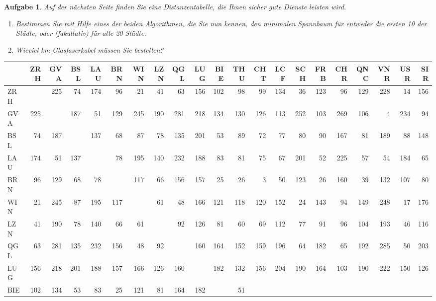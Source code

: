 \documentclass[12pt,a4paper]{report}
\theoremstyle{break}
\newtheorem{exercise}{Aufgabe}[section]
\theoremstyle{plain}
\begin{document}
\begin{exercise}
Auf der n\"achsten Seite finden Sie eine Distanzentabelle, die Ihnen
sicher gute Dienste leisten wird. 

\begin{enumerate}
\item Bestimmen Sie mit Hilfe eines der
beiden Algorithmen, die Sie nun kennen, den minimalen Spannbaum
f\"{u}r entweder die ersten 10 der St\"{a}dte, oder (fakultativ)
f\"{u}r alle 20 St\"{a}dte.
\item Wieviel km Glasfaserkabel m\"{u}ssen Sie bestellen?
\end{enumerate}

\end{exercise}

\newpage
\pagestyle{empty}
\begin{sideways}
\footnotesize
\begin{tabular}{|l|r|r|r|r|r|r|r|r|r|r||r|r|r|r|r|r|r|r|r|r|}\hline
 & ZRH & GVA & BSL & LAU & BRN & WIN & LZN & QGL & LUG & BIE & THU & CHT & LCF & SCH & FRB & CHR & QNC & VNR & USR & SIR \\ \hline
ZRH & & 225 &  74 & 174 &  96 &  21 &  41 &  63 & 156 & 102 &  98 &  99 & 134 &  36 & 123 &  96 & 129 & 228 &  14 & 156 \\
GVA & 225 & & 187 &  51 & 129 & 245 & 190 & 281 & 218 & 134 & 130 & 126 & 113 & 252 & 103 & 269 & 106 &   4 & 234 &  94 \\
BSL &  74 & 187 & & 137 &  68 &  87 &  78 & 135 & 201 &  53 &  89 &  72 &  77 &  80 &  90 & 167 &  81 & 189 &  88 & 148 \\
LAU & 174 &  51 & 137 & &  78 & 195 & 140 & 232 & 188 &  83 &  81 &  75 &  67 & 201 &  52 & 225 &  57 &  54 & 184 &  65 \\
BRN &  96 & 129 &  68 &  78 & & 117 &  66 & 156 & 157 &  25 &  26 &   3 &  50 & 123 &  26 & 160 &  39 & 132 & 107 &  80 \\
WIN &  21 & 245 &  87 & 195 & 117 & &  61 &  48 & 166 & 121 & 118 & 120 & 152 &  24 & 143 &  94 & 149 & 248 &  17 & 176 \\
LZN &  41 & 190 &  78 & 140 &  66 &  61 & &  92 & 126 &  81 &  60 &  69 & 112 &  77 &  91 &  96 & 104 & 193 &  46 & 116 \\
QGL &  63 & 281 & 135 & 232 & 156 &  48 &  92 & & 160 & 164 & 152 & 159 & 196 &  64 & 182 &  65 & 192 & 285 &  50 & 203 \\
LUG & 156 & 218 & 201 & 188 & 157 & 166 & 126 & 160 & & 182 & 132 & 156 & 204 & 190 & 164 & 103 & 190 & 222 & 150 & 126 \\
BIE & 102 & 134 &  53 &  83 &  25 & 121 &  81 & 164 & 182 & &  51 &

\end{tabular}
\end{sideways}
\end{document}
